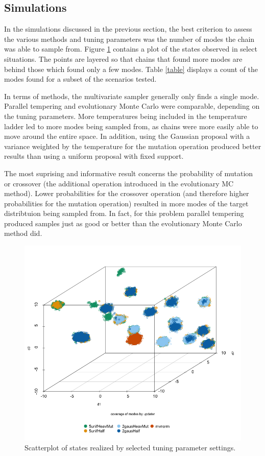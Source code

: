 \documentclass[12pt]{article}\usepackage[]{graphicx}\usepackage[]{color}
\begin{document}
\subsection{Simulations}
\label{sec:simulations}

In the simulations discussed in the previous section, the best
criterion to assess the various methods and tuning parameters was the
number of modes the chain was able to sample from.  Figure
\ref{scatterplot} contains a plot of the states observed in select
situations. The points are layered so that chains that found more
modes are behind those which found only a few modes. Table \ref{table}
displays a count of the modes found for a subset of the scenarios
tested. 

In terms of methods, the multivariate sampler generally only finds a
single mode.  Parallel tempering and evolutionary Monte Carlo were
comparable, depending on the tuning parameters.  More temperatures
being included in the temperature ladder led to more modes being
sampled from, as chains were more easily able to move around the
entire space.  In addition, using the Gaussian proposal with a
variance weighted by the temperature for the mutation operation
produced better results than using a uniform proposal with fixed
support.

The most suprising and informative result concerns the probability of
mutation or crossover (the additional operation introduced in the
evolutionary MC method).  Lower probabilities for the crossover
operation (and therefore higher probabilities for the mutation
operation) resulted in more modes of the target distribtuion being
sampled from.  In fact, for this problem parallel tempering produced
samples just as good or better than the evolutionary Monte Carlo
method did.

\begin{figure}
  \centering
  \caption{Scatterplot of states realized by selected tuning parameter
    settings.}
  \label{scatterplot}
  \includegraphics[width=\textwidth]{figure/final_plot.png}
\end{figure}
\end{document}
